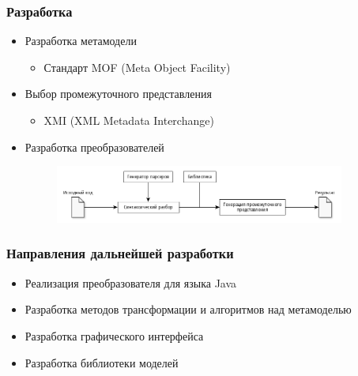 \documentclass{beamer}
\begin{document}
\begin{frame}
\frametitle{Разработка}

\begin{itemize}
    \item Разработка метамодели
        \begin{itemize}
            \item Стандарт MOF (Meta Object Facility)
        \end{itemize}
    \item Выбор промежуточного представления
        \begin{itemize}
            \item XMI (XML Metadata Interchange)
        \end{itemize}
    \item Разработка преобразователей
        \begin{figure}[h!]
            \begin{center}
                \includegraphics[width=0.9\textwidth]{img/parser_architecture.png}
            \end{center}
        \end{figure}
\end{itemize}

\end{frame}

\begin{frame}
\frametitle{Направления дальнейшей разработки}

\begin{itemize}
    \item Реализация преобразователя для языка Java
    \item Разработка методов трансформации и алгоритмов над метамоделью
    \item Разработка графического интерфейса
    \item Разработка библиотеки моделей
\end{itemize}
\end{frame}
\end{document}
